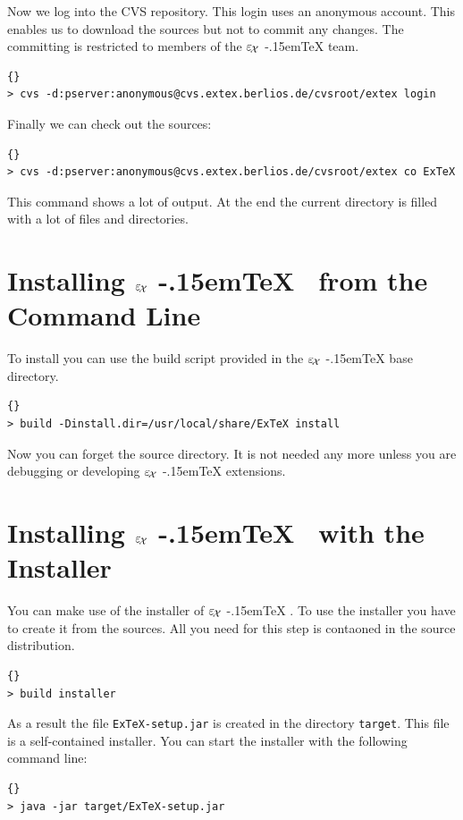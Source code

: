 \documentclass[12pt,div12,a4paper]{scrbook}
\providecommand*{\ExTeX}{\ifx\texorpdfstring\undefined
  \textrm{%
    \ensuremath{\textstyle\varepsilon_{\kern-0.15em\mathcal{X}}}%
    \kern-.15em\TeX}%
  \else\texorpdfstring{%
  \textrm{%
    \ensuremath{\textstyle\varepsilon_{\kern-0.15em\mathcal{X}}}%
    \kern-.15em\TeX
  }}{ExTeX}%
  \fi
}
\begin{document}
Now we log into the CVS repository. This login uses an anonymous
account. This enables us to download the sources but not to commit any
changes. The committing is restricted to members of the \ExTeX{} team.
\begin{lstlisting}{}
> cvs -d:pserver:anonymous@cvs.extex.berlios.de/cvsroot/extex login
\end{lstlisting}

Finally we can check out the sources:
\begin{lstlisting}{}
> cvs -d:pserver:anonymous@cvs.extex.berlios.de/cvsroot/extex co ExTeX
\end{lstlisting}

This command shows a lot of output. At the end the current directory
is filled with a lot of files and directories.

\section{Installing \ExTeX\ from the Command Line}

To install you can use the build script provided in the \ExTeX{}
base directory.

\begin{lstlisting}{}
> build -Dinstall.dir=/usr/local/share/ExTeX install
\end{lstlisting}

Now you can forget the source directory. It is not needed any more
unless you are debugging or developing \ExTeX{} extensions.

\section{Installing \ExTeX\ with the Installer}

You can make use of the installer of \ExTeX. To use the installer you
have to create it from the sources. All you need for this step is
contaoned in the source distribution.

\begin{lstlisting}{}
> build installer
\end{lstlisting}

As a result the file \texttt{ExTeX-setup.jar} is created in the
directory \texttt{target}. This file is a self-contained installer.
You can start the installer with the following command line:

\begin{lstlisting}{}
> java -jar target/ExTeX-setup.jar
\end{lstlisting}
\end{document}
